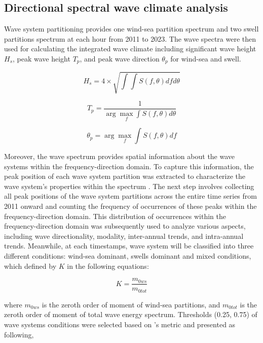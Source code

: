 \subsection{Directional spectral wave climate analysis}
\label{Directional spectral wave climate analysis}

Wave system partitioning provides one wind-sea partition spectrum and two swell
partitions spectrum at each hour from 2011 to 2023. The wave spectra were then
used for calculating the integrated wave climate including significant wave
height $H_s$, peak wave height $T_p$, and peak wave direction $\theta_p$ for
wind-sea and swell.  

\begin{equation}
    H_s=4\times \sqrt{\int \int S(f,\theta)dfd\theta}
\label{eq:eq4.6}
\end{equation}

\begin{equation}
    T_p=\frac{1}{\arg\max_f \int S(f,\theta)d\theta}
\label{eq:eq4.7}
\end{equation}

\begin{equation}
    \theta_p=\arg\max_f \int S(f,\theta)df
\label{eq:eq4.8}
\end{equation}


Moreover, the wave spectrum provides spatial information about the wave systems
within the frequency-direction domain. To capture this information, the peak
position of each wave system partition was extracted to characterize the wave
system’s properties within the spectrum \citep{portilla-yandun_wave_2015}. The
next step involves collecting all peak positions of the wave system partitions
across the entire time series from 2011 onward and counting the frequency of
occurrences of these peaks within the frequency-direction domain. This
distribution of occurrences within the frequency-direction domain was
subsequently used to analyze various aspects, including wave directionality,
modality, inter-annual trends, and intra-annual trends. Meanwhile, at each timestamps,
wave system will be classified into three different conditions: wind-sea dominant,
swells dominant and mixed conditions, which defined by $K$ in the following equations:

\begin{equation}
K = \frac{m_{0ws}}{m_{0tot}}
\label{eq:eq4.9}
\end{equation}

where $m_{0ws}$ is the zeroth order of moment of wind-sea partitions, and
$m_{0tot}$ is the zeroth order of moment of total wave energy spectrum.
Thresholds (0.25, 0.75) of wave systems conditions were selected based on
\citet{mazzaretto2024worldwide}'s metric and presented as following,

